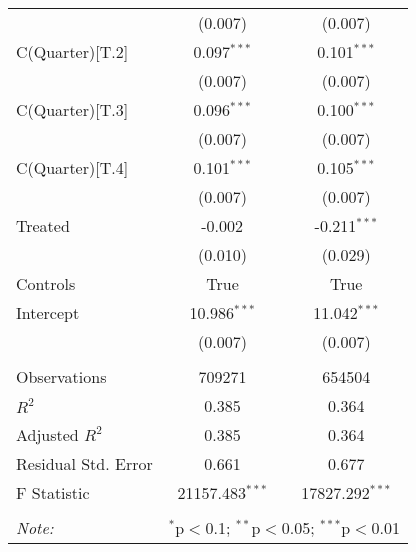 \begin{tabular}{@{\extracolsep{5pt}}lcc}
& (0.007) & (0.007) \\
 C(Quarter)[T.2] & 0.097$^{***}$ & 0.101$^{***}$ \\
& (0.007) & (0.007) \\
 C(Quarter)[T.3] & 0.096$^{***}$ & 0.100$^{***}$ \\
& (0.007) & (0.007) \\
 C(Quarter)[T.4] & 0.101$^{***}$ & 0.105$^{***}$ \\
& (0.007) & (0.007) \\
 Treated & -0.002$^{}$ & -0.211$^{***}$ \\
& (0.010) & (0.029) \\
 Controls & True & True \\
 Intercept & 10.986$^{***}$ & 11.042$^{***}$ \\
& (0.007) & (0.007) \\
\hline \\[-1.8ex]
 Observations & 709271 & 654504 \\
 $R^2$ & 0.385 & 0.364 \\
 Adjusted $R^2$ & 0.385 & 0.364 \\
 Residual Std. Error & 0.661  & 0.677  \\
 F Statistic & 21157.483$^{***}$  & 17827.292$^{***}$  \\
\hline
\hline \\[-1.8ex]
\textit{Note:} & \multicolumn{2}{r}{$^{*}$p$<$0.1; $^{**}$p$<$0.05; $^{***}$p$<$0.01} \\
\end{tabular}
